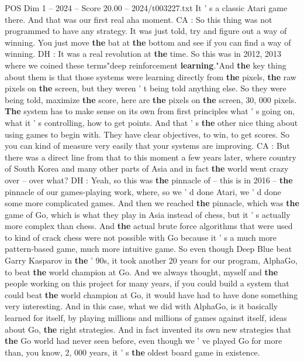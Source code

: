 \begin{textsample}{POS Dim 1 – 2024 – Score 20.00 – 2024/t003227.txt}
It ' s a classic Atari game there.
And that was our first real aha moment.
CA : So this thing was not programmed to have any strategy.
It was just told, try and figure out a way of winning.
You just move \textbf{the} bat at \textbf{the} bottom and see if you can find a way of winning.
DH : It was a real revolution at \textbf{the} time.
So this was in 2012, 2013 where we coined these terms"deep reinforcement \textbf{learning}."And \textbf{the} key thing about them is that those systems were learning directly from \textbf{the} pixels, \textbf{the} raw pixels on \textbf{the} screen, but they weren ' t being told anything else.
So they were being told, maximize \textbf{the} score, here are \textbf{the} pixels on \textbf{the} screen, 30, 000 pixels. \textbf{The} system has to make sense on its own from first principles what ' s going on, what it ' s controlling, how to get points.
And that ' s \textbf{the} other nice thing about using games to begin with.
They have clear objectives, to win, to get scores.
So you can kind of measure very easily that your systems are improving.
CA : But there was a direct line from that to this moment a few years later, where country of South Korea and many other parts of Asia and in fact \textbf{the} world went crazy over -- over what?
DH : Yeah, so this was \textbf{the} pinnacle of -- this is in 2016 -- \textbf{the} pinnacle of our games-playing work, where, so we ' d done Atari, we ' d done some more complicated games.
And then we reached \textbf{the} pinnacle, which was \textbf{the} game of Go, which is what they play in Asia instead of chess, but it ' s actually more complex than chess.
And \textbf{the} actual brute force algorithms that were used to kind of crack chess were not possible with Go because it ' s a much more pattern-based game, much more intuitive game.
So even though Deep Blue beat Garry Kasparov in \textbf{the} ' 90s, it took another 20 years for our program, AlphaGo, to beat \textbf{the} world champion at Go.
And we always thought, myself and \textbf{the} people working on this project for many years, if you could build a system that could beat \textbf{the} world champion at Go, it would have had to have done something very interesting.
And in this case, what we did with AlphaGo, is it basically learned for itself, by playing millions and millions of games against itself, ideas about Go, \textbf{the} right strategies.
And in fact invented its own new strategies that \textbf{the} Go world had never seen before, even though we ' ve played Go for more than, you know, 2, 000 years, it ' s \textbf{the} oldest board game in existence.

\end{textsample}
